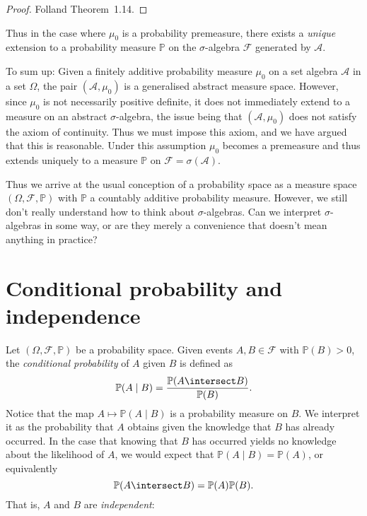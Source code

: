 \documentclass[article, a4paper, 11pt, oneside]{memoir}
\numberwithin{equation}{chapter}
\newcommand{\calF}{\mathcal{F}}
\newcommand{\calA}{\mathcal{A}}
\renewcommand{\P}{\mathbb{P}}
\begin{document}
\begin{proof}
    Folland Theorem~1.14.
\end{proof}
%
Thus in the case where $\mu_0$ is a probability premeasure, there exists a \emph{unique} extension to a probability measure $\P$ on the $\sigma$-algebra $\calF$ generated by $\calA$.

To sum up: Given a finitely additive probability measure $\mu_0$ on a set algebra $\calA$ in a set $\Omega$, the pair $(\calA,\mu_0)$ is a generalised abstract measure space. However, since $\mu_0$ is not necessarily positive definite, it does not immediately extend to a measure on an abstract $\sigma$-algebra, the issue being that $(\calA,\mu_0)$ does not satisfy the axiom of continuity. Thus we must impose this axiom, and we have argued that this is reasonable. Under this assumption $\mu_0$ becomes a premeasure and thus extends uniquely to a measure $\P$ on $\calF = \sigma(\calA)$.

Thus we arrive at the usual conception of a probability space as a measure space $(\Omega,\calF,\P)$ with $\P$ a countably additive probability measure. However, we still don't really understand how to think about $\sigma$-algebras. Can we interpret $\sigma$-algebras in some way, or are they merely a convenience that doesn't mean anything in practice?

\newcommand{\condP}[2]{\P(#1 \mid #2)}

\section{Conditional probability and independence}
\label{sec:independence}

Let $(\Omega,\calF,\P)$ be a probability space. Given events $A,B \in \calF$ with $\P(B) > 0$, the \emph{conditional probability} of $A$ given $B$ is defined as
%
\begin{equation*}
    \condP{A}{B}
        = \frac{ \P(A \intersect B) }{ \P(B) }.
\end{equation*}
%
Notice that the map $A \mapsto \condP{A}{B}$ is a probability measure on $B$. We interpret it as the probability that $A$ obtains given the knowledge that $B$ has already occurred. In the case that knowing that $B$ has occurred yields no knowledge about the likelihood of $A$, we would expect that $\condP{A}{B} = \P(A)$, or equivalently
%
\begin{equation*}
    \P(A \intersect B) = \P(A) \P(B).
\end{equation*}
%
That is, $A$ and $B$ are \emph{independent}:
\end{document}

